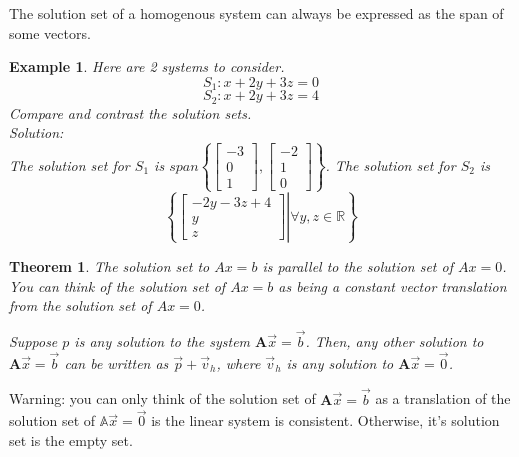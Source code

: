 \documentclass[11pt]{article}
\newtheorem{thm}{Theorem}
\newtheorem{ex}{Example}
\begin{document}
The solution set of a homogenous system can always be expressed as the span of some vectors.

\begin{ex}
  Here are 2 systems to consider.
  \[S_{1} : x + 2y + 3z = 0\]
  \[S_{2} : x + 2y + 3z = 4 \]
  Compare and contrast the solution sets. \\
  Solution: \\
  The solution set for $S_{1}$ is $span \left\{\begin{bmatrix}-3 \\ 0 \\ 1\end{bmatrix}, \begin{bmatrix} -2 \\ 1 \\ 0 \end{bmatrix}\right\}$.
  The solution set for $S_{2}$ is
  \[\left \{\left.\begin{bmatrix} -2y-3z + 4 \\ y \\ z \end{bmatrix} \right| \forall y,z \in \mathbb{R}\right\}\]
\end{ex}

\begin{thm}
  The solution set to $Ax = b$ is parallel to the solution set of $Ax = 0$. You can think of the solution set of $Ax=b$ as being
  a constant vector translation from the solution set of $Ax=0$.

  Suppose $p$ is any solution to the system $\mathbf{A}\vec{x} = \vec{b}$. Then, any other solution to $\mathbf{A}\vec{x} = \vec{b}$ can
  be written as $\vec{p} + \vec{v}_{h}$, where $\vec{v}_{h}$ is any solution to $\mathbf{A}\vec{x} = \vec{0}$.
\end{thm}
Warning: you can only think of the solution set of $\mathbf{A}\vec{x} = \vec{b}$ as a translation of the solution set of $\mathbb{A}\vec{x} = \vec{0}$ is the linear system is consistent. Otherwise, it's solution set is the
empty set.
\end{document}
